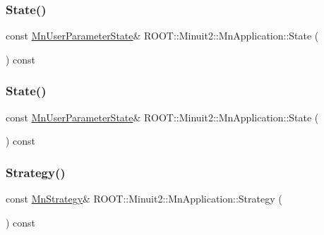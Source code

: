 \subsubsection{\texorpdfstring{State()}{State()}\hspace{0.1cm}{\footnotesize\ttfamily [1/2]}}
{\footnotesize\ttfamily const \mbox{\hyperlink{classROOT_1_1Minuit2_1_1MnUserParameterState}{Mn\+User\+Parameter\+State}}\& R\+O\+O\+T\+::\+Minuit2\+::\+Mn\+Application\+::\+State (\begin{DoxyParamCaption}{ }\end{DoxyParamCaption}) const\hspace{0.3cm}{\ttfamily [inline]}}

\mbox{\label{classROOT_1_1Minuit2_1_1MnApplication_ac82c0ac40ced7cf8904dc702a79512f7}} 
\subsubsection{\texorpdfstring{State()}{State()}\hspace{0.1cm}{\footnotesize\ttfamily [2/2]}}
{\footnotesize\ttfamily const \mbox{\hyperlink{classROOT_1_1Minuit2_1_1MnUserParameterState}{Mn\+User\+Parameter\+State}}\& R\+O\+O\+T\+::\+Minuit2\+::\+Mn\+Application\+::\+State (\begin{DoxyParamCaption}{ }\end{DoxyParamCaption}) const\hspace{0.3cm}{\ttfamily [inline]}}

\mbox{\label{classROOT_1_1Minuit2_1_1MnApplication_ad4eba6a0369cc3fa9ce9b676582a77a7}} 
\subsubsection{\texorpdfstring{Strategy()}{Strategy()}\hspace{0.1cm}{\footnotesize\ttfamily [1/2]}}
{\footnotesize\ttfamily const \mbox{\hyperlink{classROOT_1_1Minuit2_1_1MnStrategy}{Mn\+Strategy}}\& R\+O\+O\+T\+::\+Minuit2\+::\+Mn\+Application\+::\+Strategy (\begin{DoxyParamCaption}{ }\end{DoxyParamCaption}) const\hspace{0.3cm}{\ttfamily [inline]}}


